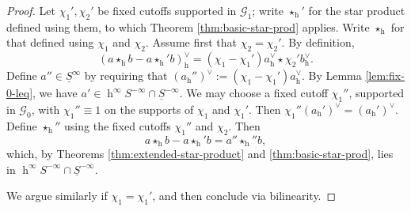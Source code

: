 \documentclass[reqno]{amsart}
\DeclareMathOperator{\h}{h}
\theoremstyle{plain} \newtheorem{theorem} {Theorem}
\theoremstyle{definition} \newtheorem{definition} [theorem] {Definition}
\theoremstyle{itplain} %
\numberwithin{equation}{section}
\numberwithin{theorem}{section}
\begin{document}
\begin{proof}
  Let $\chi_1', \chi_2'$ be fixed cutoffs supported in $\mathcal{G}_1$; write $\star_{\h}'$ for the star product defined using them, to which Theorem \ref{thm:basic-star-prod} applies.  Write $\star_{\h}$ for that defined using $\chi_1$ and $\chi_2$.  Assume first that $\chi_2 = \chi_2'$.
  By definition,
  \begin{equation*}
    (a \star_{\h} b - a \star_{\h} ' b)_{\h}^\vee
    = (\chi_1 - \chi_1 ') a_{\h}^\vee \star \chi_2 ' b_{\h}^\vee.
  \end{equation*}
  Define $a'' \in \underline{S}^\infty$ by requiring that $(a_{\h}'')^\vee  := (\chi_1 - \chi_1 ') a_{\h}^\vee$.  By Lemma \ref{lem:fix-0-leq}, we have $a' \in \h^\infty S^{-\infty} \cap \underline{S}^{-\infty}$.  We may choose a fixed cutoff $\chi_1 ''$, supported in $\mathcal{G}_0$, with $\chi_1'' \equiv 1$ on the supports of $\chi_1$ and $\chi_1 '$.  Then $\chi_1 '' (a_{\h}')^\vee  = (a_{\h}')^\vee$.  Define $\star_{\h}''$ using the fixed cutoffs $\chi_1''$ and $\chi_2$.  Then
  \begin{equation*}
    a \star_{\h} b - a \star_{\h}' b = a'' \star_{\h}'' b,
  \end{equation*}
  which, by Theorems \ref{thm:extended-star-product} and \ref{thm:basic-star-prod}, lies in $\h^\infty S^{-\infty} \cap \underline{S}^{-\infty}$.

  We argue similarly if $\chi_1 = \chi_1'$, and then conclude via bilinearity.
\end{proof}
\end{document}
